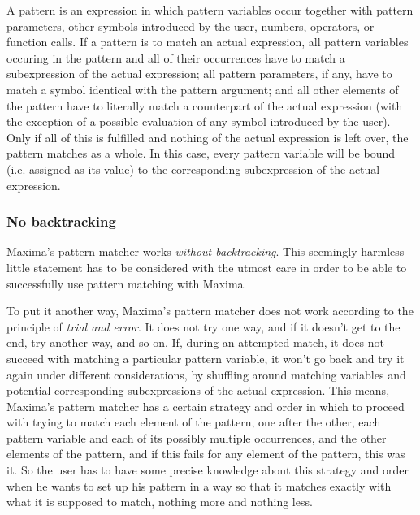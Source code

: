 \documentclass[../Maxima_Workbook.tex]{subfiles}
\begin{document}
\lz A pattern is an expression in which pattern variables occur together with pattern parameters, other symbols introduced by the user, numbers, operators, or function calls. If a pattern is to match an actual expression, all pattern variables occuring in the pattern and all of their occurrences have to match a subexpression of the actual expression; all pattern parameters, if any, have to match a symbol identical with the pattern argument; and all other elements of the pattern have to literally match a counterpart of the actual expression (with the exception of a possible evaluation of any symbol introduced by the user). Only if all of this is fulfilled and nothing of the actual expression is left over, the pattern matches as a whole. In this case, every pattern variable will be bound (i.e. assigned as its value) to the corresponding subexpression of the actual expression.

\subsubsection{No backtracking}

Maxima's pattern matcher works \emph{without backtracking}. This seemingly harmless little statement has to be considered with the utmost care in order to be able to successfully use pattern matching with Maxima.

\lz To put it another way, Maxima's pattern matcher does not work according to the principle of \emph{trial and error}. It does not try one way, and if it doesn't get to the end, try another way, and so on. If, during an attempted match, it does not succeed with matching a particular pattern variable, it won't go back and try it again under different considerations, by shuffling around matching variables and potential corresponding subexpressions of the actual expression. This means, Maxima's pattern matcher has a certain strategy and order in which to proceed with trying to match each element of the pattern, one after the other, each pattern variable and each of its possibly multiple occurrences, and the other elements of the pattern, and if this fails for any element of the pattern, this was it. So the user has to have some precise knowledge about this strategy and order when he wants to set up his pattern in a way so that it matches exactly with what it is supposed to match, nothing more and nothing less.
\end{document}
